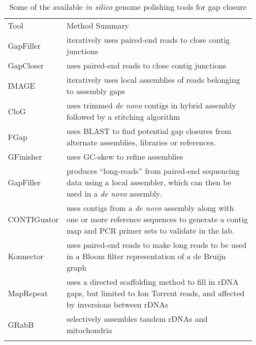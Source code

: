 \documentclass[a4,center,fleqn]{NAR}
\begin{document}
\begin{table*}[t]
\centering
\caption{Some of the available \textit{in silico} genome polishing tools for gap closure}
\label{table:tools}
\begin{tabular*}{\textwidth}{p{2.7cm}p{13cm}}
  \toprule
  Tool &  Method Summary \\
  \colrule
  GapFiller\cite{Boetzer2012} & iteratively uses paired-end reads to close contig junctions \\

  GapCloser\cite{Luo2012} & uses paired-end reads to close contig junctions \\

  IMAGE \cite{Tsai2010} & iteratively uses local assemblies of reads belonging to  assembly gaps \\

  CloG \cite{Yang2011} & uses trimmed \textit{de novo} contigs in hybrid assembly followed by a stitching algorithm \\

  FGap \cite{Piro2014,Guizelini2016} & uses BLAST to find potential gap closures from alternate assemblies, libraries or references. \\

  GFinisher \cite{Guizelini2016} & uses GC-skew to refine assemblies \\

  GapFiller \cite{Nadalin2012} &  produces ``long-reads'' from paired-end sequencing data using a local assembler, which can then be used in a \textit{de novo} assembly. \\

  CONTIGuator\cite{Galardini2011} & uses contigs from a \textit{de novo} assembly along with one or more reference sequences to generate a contig map and PCR primer sets to validate in the lab. \\

  Konnector\cite{Vandervalk2015} & uses paired-end reads to make long reads to be used in a Bloom filter representation of a de Bruijn graph \\

  MapRepeat\cite{Mariano2015} & uses a directed scaffolding method to fill in rDNA gaps, but limited to Ion Torrent reads, and affected by inversions between rDNAs \cite{Mariano2016} \\

  GRabB\cite{Brankovics2016} & selectively assembles tandem rDNAs and mitochondria\\
  \botrule
\end{tabular*}
\end{table*}
\end{document}
